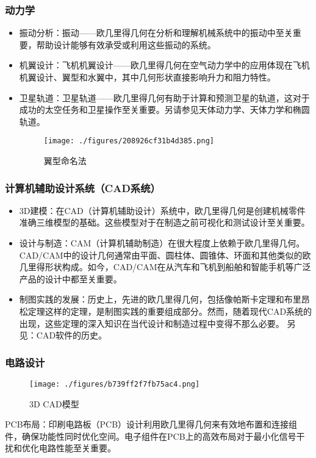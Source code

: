 \subsubsection{动力学}
\begin{itemize}
\item 振动分析：振动——欧几里得几何在分析和理解机械系统中的振动中至关重要，帮助设计能够有效承受或利用这些振动的系统。
\item 机翼设计：飞机机翼设计——欧几里得几何在空气动力学中的应用体现在飞机机翼设计、翼型和水翼中，其中几何形状直接影响升力和阻力特性。
\item 卫星轨道：卫星轨道——欧几里得几何有助于计算和预测卫星的轨道，这对于成功的太空任务和卫星操作至关重要。另请参见天体动力学、天体力学和椭圆轨道。
\begin{figure}[ht]
\centering
\texttt{[image: ./figures/208926cf31b4d385.png]}
\caption{翼型命名法} \label{fig_OJLJH_14}
\end{figure}
\end{itemize}
\subsubsection{计算机辅助设计系统（CAD系统）}
\begin{itemize}
\item 3D建模：在CAD（计算机辅助设计）系统中，欧几里得几何是创建机械零件准确三维模型的基础。这些模型对于在制造之前可视化和测试设计至关重要。  
\item 设计与制造：CAM（计算机辅助制造）在很大程度上依赖于欧几里得几何。CAD/CAM中的设计几何通常由平面、圆柱体、圆锥体、环面和其他类似的欧几里得形状构成。如今，CAD/CAM在从汽车和飞机到船舶和智能手机等广泛产品的设计中都至关重要。  
\item 制图实践的发展：历史上，先进的欧几里得几何，包括像帕斯卡定理和布里昂松定理这样的定理，是制图实践的重要组成部分。然而，随着现代CAD系统的出现，这些定理的深入知识在当代设计和制造过程中变得不那么必要。  
另见：CAD软件的历史。
\end{itemize}
\subsubsection{电路设计}
\begin{figure}[ht]
\centering
\texttt{[image: ./figures/b739ff2f7fb75ac4.png]}
\caption{3D CAD模型} \label{fig_OJLJH_15}
\end{figure}
PCB布局：印刷电路板（PCB）设计利用欧几里得几何来有效地布置和连接组件，确保功能性同时优化空间。电子组件在PCB上的高效布局对于最小化信号干扰和优化电路性能至关重要。
